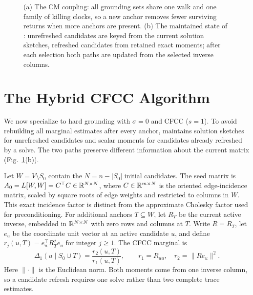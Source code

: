 \begin{figure}[t]
\caption{(a) The CM coupling: all grounding sets share one walk and one
family of killing clocks, so a new anchor removes fewer surviving
returns when more anchors are present. (b) The maintained state of
\alg{}: unrefreshed candidates are keyed from the current solution sketches,
refreshed candidates from retained exact moments; after each selection
both paths are updated from the selected inverse columns.}
\label{fig:overview}
\end{figure}

\section{The Hybrid CFCC Algorithm}\label{sec:algorithm}
We now specialize to hard grounding with $\sigma=0$ and CFCC
($s=1$). To avoid rebuilding all marginal estimates after every
anchor, \alg{} maintains solution sketches for unrefreshed candidates
and scalar moments for candidates already refreshed by a solve.
The two paths preserve different information about the current matrix
(Fig.~\ref{fig:overview}(b)).

Let $W=V\setminus S_0$ contain the $N=n-|S_0|$ initial candidates.
The seed matrix is $A_0=L[W,W]=C^\top C\in\mathbb R^{N\times N}$,
where $C\in\mathbb R^{m\times N}$ is the oriented edge-incidence matrix,
scaled by square roots of edge weights and restricted to columns in
$W$. This exact incidence factor is distinct from the approximate
Cholesky factor used for preconditioning. For additional anchors
$T\subseteq W$, let $R_T$ be the current active inverse, embedded
in $\mathbb R^{N\times N}$ with zero rows and columns at $T$.
Write $R=R_T$, let $e_u$ be the coordinate unit vector at an active
candidate $u$, and define $r_j(u,T)=e_u^\top R_T^j e_u$ for
integer $j\geq1$. The CFCC marginal is
\begin{equation}\label{eq:ratio}
 \Delta_1(u\mid S_0\cup T)=\frac{r_2(u,T)}{r_1(u,T)},\qquad
 r_1=R_{uu},\quad r_2=\|Re_u\|^2.
\end{equation}
Here $\|\cdot\|$ is the Euclidean norm. Both moments come from
one inverse column, so a candidate refresh requires one solve
rather than two complete trace estimates.


